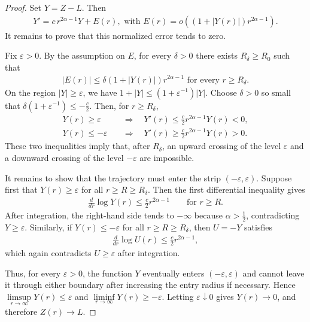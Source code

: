 \documentclass{amsart}
\theoremstyle{plain}
\theoremstyle{mainintrothm}
\theoremstyle{definition}
\begin{document}
	\begin{proof}
		Set $Y=Z-L$.  Then
		\begin{align*}
			Y'
			=
			c\,r^{2\alpha-1}Y
			+
			E(r),
			\mbox{ with }
			E(r)
			=
			o\!\left((1+|Y(r)|)r^{2\alpha-1}\right).
		\end{align*}
		It remains to prove that this normalized error tends to zero.
		
		\medskip
		
		Fix $\varepsilon>0$.  By the assumption on $E$, for every $\delta>0$ there
		exists $R_\delta\ge R_0$ such that
		\begin{align*}
			|E(r)|
			\le
			\delta(1+|Y(r)|)r^{2\alpha-1}
			\text{ for every }r\ge R_\delta.
		\end{align*}
		On the region $|Y|\ge\varepsilon$, we have
		$1+|Y|\le(1+\varepsilon^{-1})|Y|$.  Choose $\delta>0$ so small that
		$\delta(1+\varepsilon^{-1})\le-\frac{c}{2}$.  Then, for $r\ge R_\delta$,
		\begin{align*}
			Y(r)\ge\varepsilon
			&\quad\Longrightarrow\quad
			Y'(r)\le\frac{c}{2}r^{2\alpha-1}Y(r)<0,\\
			Y(r)\le-\varepsilon
			&\quad\Longrightarrow\quad
			Y'(r)\ge\frac{c}{2}r^{2\alpha-1}Y(r)>0.
		\end{align*}
		These two inequalities imply that, after $R_\delta$, an upward crossing of
		the level $\varepsilon$ and a downward crossing of the level $-\varepsilon$
		are impossible.
		
		\medskip
		
		It remains to show that the trajectory must enter the strip
		$(-\varepsilon,\varepsilon)$.  Suppose first that $Y(r)\ge\varepsilon$ for all
		$r\ge R\ge R_\delta$.  Then the first differential inequality gives
		\begin{align*}
			\frac{d}{dr}\log Y(r)
			\le
			\frac{c}{2}r^{2\alpha-1}
			\qquad
			\text{for }r\ge R.
		\end{align*}
		After integration, the right-hand side tends to $-\infty$ because
		$\alpha>\frac{1}{2}$, contradicting $Y\ge\varepsilon$.  Similarly, if
		$Y(r)\le-\varepsilon$ for all $r\ge R\ge R_\delta$, then
		$U=-Y$ satisfies
		\begin{align*}
			\frac{d}{dr}\log U(r)
			\le
			\frac{c}{2}r^{2\alpha-1},
		\end{align*}
		which again contradicts $U\ge\varepsilon$ after integration.
		
		Thus, for every $\varepsilon>0$, the function $Y$ eventually enters
		$(-\varepsilon,\varepsilon)$ and cannot leave it through either boundary
		after increasing the entry radius if necessary.  Hence
		$\limsup\limits_{r\to\infty}Y(r)\le\varepsilon$ and
		$\liminf\limits_{r\to\infty}Y(r)\ge-\varepsilon$.  Letting
		$\varepsilon\downarrow0$ gives $Y(r)\to0$, and therefore $Z(r)\to L$.
	\end{proof}
	
\end{document}
